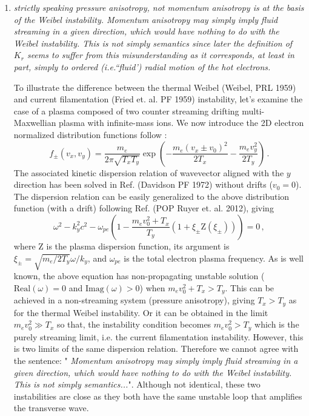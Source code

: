 \documentclass[aps,showpacs,superscriptaddress]{revtex4}%
\begin{document}
\begin{enumerate}
\item \textit{strictly speaking pressure anisotropy, not momentum anisotropy is at the basis of the Weibel instability. Momentum anisotropy may simply imply fluid streaming in a given direction, which would have nothing to do with the Weibel instability. This is not simply semantics since later the definition of $K_r$ seems to suffer from this misunderstanding as it corresponds, at least in part, simply to ordered (i.e.``fluid') radial motion of the hot electrons. }

To illustrate the difference between the thermal Weibel (Weibel, PRL 1959) and current filamentation (Fried et. al. PF 1959) instability, let's examine the case of a plasma composed of two counter streaming drifting multi-Maxwellian plasma with infinite-mass ions.
We now introduce the 2D electron normalized  distribution functions follow :
 \begin{equation}
f_{ \pm}(v_x, v_y)  = \frac{ m_e }{2 \pi \sqrt{  T_x T_y  } }\exp\left( -\frac{ m_e (v_x \pm v_0)^2 }{ 2T_x }  -  \frac{ m_e v_y^2 }{ 2 T_y }\right) \, .
 \end{equation}
The associated kinetic dispersion relation of wavevector aligned with the $y$ direction has been solved in Ref.  (Davidson PF 1972) without drifts ($v_0=0$). The dispersion relation can be easily generalized to the above distribution function (with a drift)
following Ref. (POP Ruyer et. al. 2012),  giving
 \begin{equation}
 \omega^2 -k_y^2c^2 -  \omega_{pe}\left( 
1 -  \frac{ m_e v_0^2  + T_x }{ T_y }  ( 1 +\xi_\pm \mathrm{ Z }(\xi_\pm)  ) 
\right) =0 \, ,
 \end{equation}
where $ \mathrm{ Z }$ is the plasma dispersion function, its argument is $\xi_\pm =\sqrt{  m_e/2 T_y  }   \omega/k_y$, and 
$\omega_{pe}$ is the total electron plasma frequency. As is well known, the above equation has non-propagating unstable solution ($\mathrm{Real}(\omega)=0$ and $\mathrm{Imag}(\omega)>0$) when $m_e v_0^2  + T_x > T_y$.
This can be achieved in a non-streaming system (pressure anisotropy), giving $T_x > T_y$ as for the thermal Weibel instability. 
Or it can be obtained in the limit $m_e v_0^2  \gg T_x$ so that, the instability condition becomes  $m_e v_0^2  > T_y$ which is the purely streaming limit, i.e.  the current filamentation instability.
However, this is two limits of the same dispersion relation. Therefore we cannot agree with the sentence: " \textit{Momentum anisotropy may simply imply fluid streaming in a given direction, which would have nothing to do with the Weibel instability. This is not simply semantics...}". 
Although not identical, these two instabilities are   close as they both   have the same unstable loop that amplifies the transverse wave.


\end{enumerate}
\end{document}
